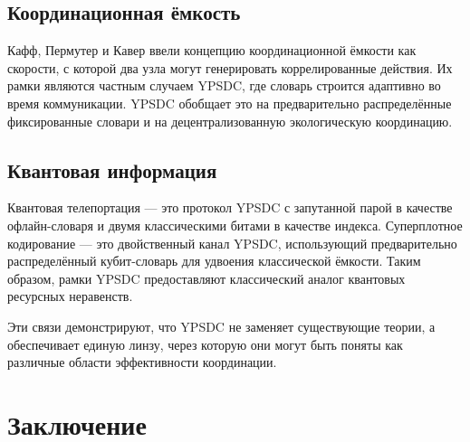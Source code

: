 \documentclass[12pt,a4paper]{article}
\theoremstyle{remark}
\begin{document}
	\subsection*{Координационная ёмкость}
	Кафф, Пермутер и Кавер \cite{Cuff2013} ввели концепцию координационной ёмкости как скорости, с которой два узла могут генерировать коррелированные действия. Их рамки являются частным случаем YPSDC, где словарь строится адаптивно во время коммуникации. YPSDC обобщает это на предварительно распределённые фиксированные словари и на децентрализованную экологическую координацию.
	
	\subsection*{Квантовая информация}
	Квантовая телепортация \cite{Bennett1993} — это протокол YPSDC с запутанной парой в качестве офлайн-словаря и двумя классическими битами в качестве индекса. Суперплотное кодирование — это двойственный канал YPSDC, использующий предварительно распределённый кубит-словарь для удвоения классической ёмкости. Таким образом, рамки YPSDC предоставляют классический аналог квантовых ресурсных неравенств.
	
	Эти связи демонстрируют, что YPSDC не заменяет существующие теории, а обеспечивает единую линзу, через которую они могут быть поняты как различные области эффективности координации.
	
	\clearpage
	\section{Заключение}
	
\end{document}
